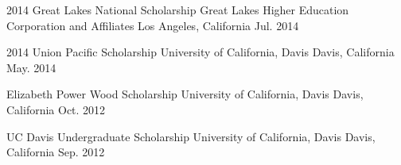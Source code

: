 



\begin{cvhonors}

  \cvhonor
    {2014 Great Lakes National Scholarship} %
    {Great Lakes Higher Education Corporation and Affiliates} %
    {Los Angeles, California} %
    {Jul. 2014} %

\end{cvhonors}




\begin{cvhonors}

  \cvhonor
    {2014 Union Pacific Scholarship} %
    {University of California, Davis} %
    {Davis, California} %
    {May. 2014} %

  \cvhonor
    {Elizabeth Power Wood Scholarship} %
    {University of California, Davis} %
    {Davis, California} %
    {Oct. 2012} %

  \cvhonor
    {UC Davis Undergraduate Scholarship} %
    {University of California, Davis} %
    {Davis, California} %
    {Sep. 2012} %

\end{cvhonors}


